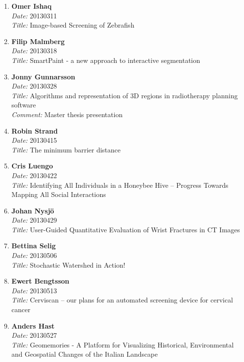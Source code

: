 \begin{enumerate}
\item
{\bf Omer Ishaq}~\\
{\em Date:} 20130311 ~\\
{\em Title:} Image-based Screening of Zebrafish

\item
{\bf Filip Malmberg}~\\
{\em Date:} 20130318 ~\\
{\em Title:} SmartPaint - a new approach to interactive segmentation

\item
{\bf Jonny Gunnarsson}~\\
{\em Date:} 20130328 ~\\
{\em Title:} Algorithms and representation of 3D regions in radiotherapy planning software~\\
{\em Comment:} Master thesis presentation

\item
{\bf Robin Strand}~\\
{\em Date:} 20130415 ~\\
{\em Title:} The minimum barrier distance

\item
{\bf Cris Luengo}~\\
{\em Date:} 20130422 ~\\
{\em Title:} Identifying All Individuals in a Honeybee Hive -- Progress Towards Mapping All Social Interactions

\item
{\bf Johan Nysj\"{o} }~\\
{\em Date:} 20130429 ~\\
{\em Title:} User-Guided Quantitative Evaluation of Wrist Fractures in CT Images

\item
{\bf Bettina Selig }~\\
{\em Date:} 20130506 ~\\
{\em Title:} Stochastic Watershed in Action!

\item
{\bf Ewert Bengtsson}~\\
{\em Date:} 20130513 ~\\
{\em Title:} Cerviscan -- our plans for an automated screening device for cervical cancer

\item
{\bf Anders Hast}~\\
{\em Date:} 20130527 ~\\
{\em Title:} Geomemories - A Platform for Visualizing Historical, Environmental and Geospatial Changes of the Italian Landscape


\end{enumerate}
